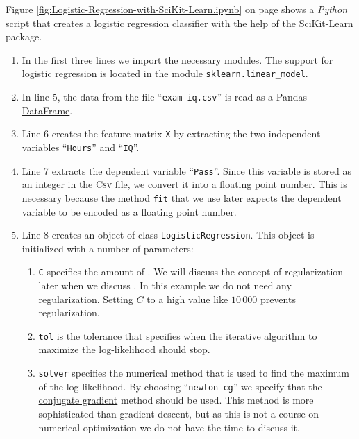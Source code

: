 Figure \ref{fig:Logistic-Regression-with-SciKit-Learn.ipynb} on page
\pageref{fig:Logistic-Regression-with-SciKit-Learn.ipynb} shows a \textsl{Python} script that creates a
logistic regression classifier with the help of the SciKit-Learn package.
\begin{enumerate}
\item In the first three lines we import the necessary modules.
      The support for logistic regression is located in the module
      \texttt{sklearn.linear\_model}.
\item In line 5, the data from the file ``\texttt{exam-iq.csv}'' is read as a Pandas
      \href{https://pandas.pydata.org/pandas-docs/stable/reference/api/pandas.DataFrame.html}{DataFrame}.
\item Line 6 creates the feature matrix \texttt{X} by extracting the two independent variables ``\texttt{Hours}''
      and ``\texttt{IQ}''.
\item Line 7 extracts the dependent variable ``\texttt{Pass}''.  Since this variable is stored as an integer in
      the \textsc{Csv} file, we convert it into a floating point number.  This is necessary because the method
      \texttt{fit} that we use later expects the dependent variable to be encoded as a floating point number.
\item Line 8 creates an object of class \texttt{LogisticRegression}.  This object is initialized with a number
      of parameters:
      \begin{enumerate}
      \item \texttt{C} specifies the amount of .  We will discuss the concept of
            regularization later when we discuss .
            In this example we do not need any regularization.  Setting $C$ to a high value like $10\,000$
            prevents regularization.
      \item \texttt{tol} is the tolerance that specifies when the iterative algorithm to maximize the
            log-likelihood should stop.
      \item \texttt{solver} specifies the numerical method that is used to find the maximum of the
            log-likelihood. By choosing ``\texttt{newton-cg}'' we specify that the
            \href{https://en.wikipedia.org/wiki/Conjugate_gradient_method}{conjugate gradient}
            method should be used.  This method is more sophisticated than gradient descent, but as this is not
            a course on numerical optimization we do not have the time to discuss it.

\end{enumerate}
\end{enumerate}

